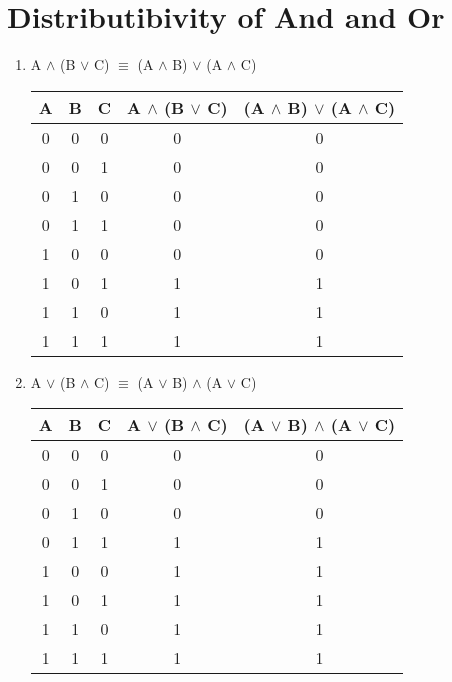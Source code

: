 \documentclass{report}
\begin{document}
\section{Distributibivity of And and Or}
\begin{enumerate}

  \item A $\land$ (B $\lor$ C) $\equiv$ (A $\land$ B) $\lor$ (A $\land$ C)

\begin{center}
  \begin{tabular}{| c | c | c | c | c |}
    \hline
    A & B & C & A $\land$ (B $\lor$ C) & (A $\land$ B) $\lor$ (A $\land$ C) \\ \hline
    0 & 0 & 0 & 0 & 0 \\
    0 & 0 & 1 & 0 & 0 \\
    0 & 1 & 0 & 0 & 0 \\
    0 & 1 & 1 & 0 & 0 \\
    1 & 0 & 0 & 0 & 0 \\
    1 & 0 & 1 & 1 & 1 \\
    1 & 1 & 0 & 1 & 1 \\
    1 & 1 & 1 & 1 & 1 \\ \hline
  \end{tabular}
\end{center}

  \item A $\lor$ (B $\land$ C) $\equiv$ (A $\lor$ B) $\land$ (A $\lor$ C)

\begin{center}
  \begin{tabular}{| c | c | c | c | c |}
    \hline
    A & B & C & A $\lor$ (B $\land$ C) & (A $\lor$ B) $\land$ (A $\lor$ C) \\ \hline
    0 & 0 & 0 & 0 & 0 \\
    0 & 0 & 1 & 0 & 0 \\
    0 & 1 & 0 & 0 & 0 \\
    0 & 1 & 1 & 1 & 1 \\
    1 & 0 & 0 & 1 & 1 \\
    1 & 0 & 1 & 1 & 1 \\
    1 & 1 & 0 & 1 & 1 \\
    1 & 1 & 1 & 1 & 1 \\ \hline
  \end{tabular}
\end{center}
\end{enumerate}
\end{document}
